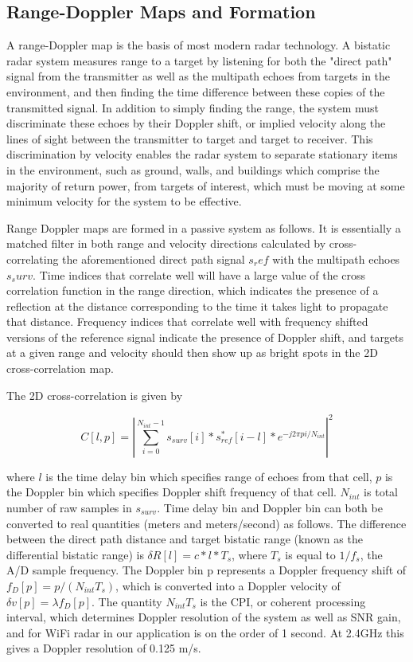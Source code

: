 \documentclass[article,11pt,onecolumn,final]{IEEEtran}
\begin{document}
\subsection{Range-Doppler Maps and Formation}

A range-Doppler map is the basis of most modern radar technology. A bistatic radar system measures range to a target by listening for both the "direct path" signal from the transmitter as well as the multipath echoes from targets in the environment, and then finding the time difference between these copies of the transmitted signal. In addition to simply finding the range, the system must discriminate these echoes by their Doppler shift, or implied velocity along the lines of sight between the transmitter to target and target to receiver. This discrimination by velocity enables the radar system to separate stationary items in the environment, such as ground, walls, and buildings which comprise the majority of return power, from targets of interest, which must be moving at some minimum velocity for the system to be effective.

Range Doppler maps are formed in a passive system as follows. It is essentially a matched filter in both range and velocity directions calculated by cross-correlating the aforementioned direct path signal $s_ref$ with the multipath echoes $s_surv$. Time indices that correlate well will have a large value of the cross correlation function in the range direction, which indicates the presence of a reflection at the distance corresponding to the time it takes light to propagate that distance. Frequency indices that correlate well with frequency shifted versions of the reference signal indicate the presence of Doppler shift, and targets at a given range and velocity should then show up as bright spots in the 2D cross-correlation map.

The 2D cross-correlation is given by

\begin{equation}
 C[l, p] = | \sum\limits_{i=0}^{N_{int}-1} s_{surv}[i]*s_{ref}^{*}[i - l]*e^{-j2\pi pi/N_{int}}|^2 
\end{equation}

where $l$ is the time delay bin which specifies range of echoes from that cell, $p$ is the Doppler bin which specifies Doppler shift frequency of that cell. $N_{int}$ is total number of raw samples in $s_{surv}$. Time delay bin and Doppler bin can both be converted to real quantities (meters and meters/second) as follows. The difference between the direct path distance and target bistatic range (known as the differential bistatic range) is $\delta R[l] = c*l*T_s$, where $T_s$ is equal to $1/f_s$, the A/D sample frequency. The Doppler bin p represents a Doppler frequency shift of $f_D[p] = p/(N_{int}T_s)$, which is converted into a Doppler velocity of $\delta v[p] = \lambda f_D[p]$. The quantity $N_{int}T_s$ is the CPI, or coherent processing interval, which determines Doppler resolution of the system as well as SNR gain, and for WiFi radar in our application is on the order of 1 second. At 2.4GHz this gives a Doppler resolution of 0.125 m/s.
\end{document}

